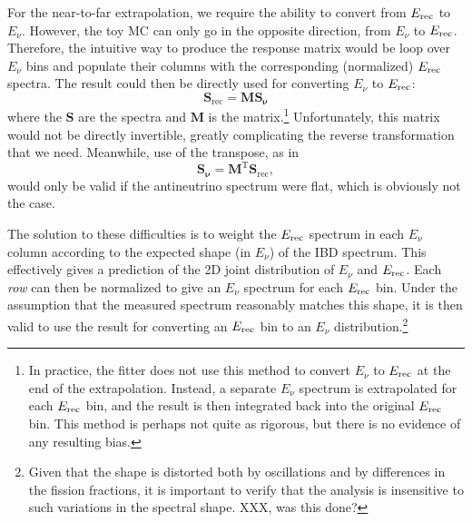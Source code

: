 \documentclass[../thesis.tex]{subfiles}
\begin{document}
For the near-to-far extrapolation, we require the ability to convert from
$E_\mathrm{rec}$ to $E_\nu$. However, the toy MC can only go in the opposite direction,
from $E_\nu$ to $E_\mathrm{rec}$. Therefore, the intuitive way to produce the response
matrix would be loop over $E_\nu$ bins and populate their columns with the
corresponding (normalized) $E_\mathrm{rec}$ spectra. The result could then be directly
used for converting $E_\nu$ to $E_\mathrm{rec}$:
\begin{equation*}
  \mathbf{S_{\mathrm{rec}}} = \mathbf{M} \mathbf{S_\nu} 
\end{equation*}
where the $\mathbf{S}$ are the spectra and $\mathbf{M}$ is the
matrix.\footnote{\label{foot:fitEnuToErec}In practice, the fitter does not use
  this method to convert $E_\nu$ to $E_\mathrm{rec}$ at the end of the
  extrapolation. Instead, a separate $E_\nu$ spectrum is extrapolated for each
  $E_\mathrm{rec}$ bin, and the result is then integrated back into the original $E_\mathrm{rec}$
  bin. This method is perhaps not quite as rigorous, but there is no evidence of
  any resulting bias.} Unfortunately, this matrix would not be directly
invertible, greatly complicating the reverse transformation that we
need. Meanwhile, use of the transpose, as in
\begin{equation*}
  \mathbf{S_\nu} = \mathbf{M^{\mathrm{T}}} \mathbf{S_{\mathrm{rec}}},
\end{equation*}
would only be valid if the antineutrino spectrum were flat, which is obviously
not the case.

The solution to these difficulties is to weight the $E_\mathrm{rec}$ spectrum in each
$E_\nu$ column according to the expected shape (in $E_\nu$) of the IBD
spectrum. This effectively gives a prediction of the 2D joint distribution of
$E_\nu$ and $E_\mathrm{rec}$. Each \emph{row} can then be normalized to give an $E_\nu$
spectrum for each $E_\mathrm{rec}$ bin. Under the assumption that the measured spectrum
reasonably matches this shape, it is then valid to use the result for converting
an $E_\mathrm{rec}$ bin to an $E_\nu$ distribution.\footnote{Given that the shape is
  distorted both by oscillations and by differences in the fission fractions, it
  is important to verify that the analysis is insensitive to such variations in
  the spectral shape. XXX, was this done?}

\begin{comment}
  We should fix genEvisToEnuMatrix.C to turn off the theta13 oscillation, and
  then note below that oscillations are disabled.
\end{comment}
\end{document}
